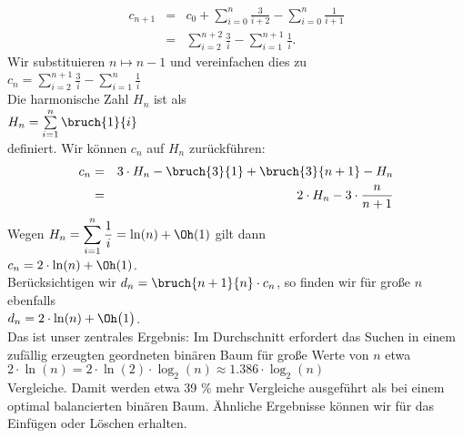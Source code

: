 \begin{eqnarray*}  
  c_{n+1} & = & c_0 + \sum\limits_{i=0}^{n} \frac{3}{i+2} - \sum\limits_{i=0}^{n} \frac{1}{i+1} 
\\[0.2cm]
          & = & \sum\limits_{i=2}^{n+2} \frac{3}{i} - \sum\limits_{i=1}^{n+1} \frac{1}{i}.
\end{eqnarray*}
Wir substituieren $n \mapsto n-1$ und vereinfachen dies zu 
\\[0.2cm]
\hspace*{1.3cm}
$c_{n} =  \displaystyle\sum\limits_{i=2}^{n+1} \frac{3}{i} - \sum\limits_{i=1}^{n} \frac{1}{i}$
\\[0.2cm]
Die harmonische Zahl $H_n$ ist als
\\[0.2cm]
\hspace*{1.3cm}
$H_n = \sum\limits_{i=1}^{n} \bruch{1}{i}$   
\\[0.2cm]
definiert.  Wir k\"onnen $c_n$ auf $H_n$ zur\"uckf\"uhren: 
\begin{eqnarray*}
   c_n & = & 3 \cdot H_n - \bruch{3}{1} + \bruch{3}{n+1} - H_n \\
       & = & 2 \cdot H_n - 3 \cdot \frac{n}{n+1} 
\end{eqnarray*}
Wegen $H_n = \displaystyle\sum\limits_{i=1}^{n} \frac{1}{i} = \ln(n) + \Oh(1)$ gilt dann \\[0.2cm]
\hspace*{1.3cm} 
$\displaystyle c_n = 2 \cdot \ln(n) + \Oh(1)$.
\\[0.2cm]
Ber\"ucksichtigen wir  $d_n = \bruch{n+1}{n}\cdot c_n$, so finden wir f\"ur gro{\ss}e $n$ ebenfalls \\[0.2cm]
\hspace*{1.3cm} $\displaystyle d_n = 2 \cdot \ln(n) + \Oh\bigl(1\bigr)$.
\\[0.2cm]
Das ist unser zentrales Ergebnis: Im Durchschnitt erfordert das Suchen in einem zuf\"allig
erzeugten geordneten bin\"aren Baum f\"ur gro{\ss}e Werte von $n$ etwa 
\\[0.2cm]
\hspace*{1.3cm}
$2 \cdot \ln(n) = 2 \cdot \ln(2) \cdot \log_2(n) \approx 1.386 \cdot \log_2(n)$ 
\\[0.2cm]
Vergleiche.  Damit werden etwa 39 \% 
mehr Vergleiche ausgef\"uhrt als bei einem optimal balancierten bin\"aren Baum.
Ähnliche Ergebnisse k\"onnen wir f\"ur das Einf\"ugen oder L\"oschen erhalten.

